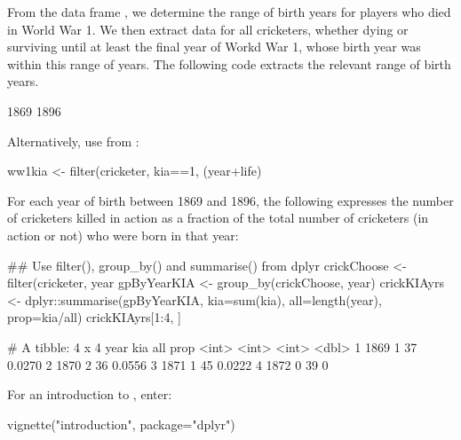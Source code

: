 From the data frame , we determine the range of birth
years for players who died in World War 1.  We then extract data for
all cricketers, whether dying or surviving until at least the final
year of Workd War 1, whose birth year was within this range of years.
The following code extracts the relevant range of birth years.
\begin{Schunk}
\begin{Soutput}
[1] 1869 1896
\end{Soutput}
\end{Schunk}

Alternatively, use  from :
\begin{Schunk}
\begin{Sinput}
ww1kia <- filter(cricketer,
                 kia==1, (year+life)%in% 1914:1918)
\end{Sinput}
\end{Schunk}

For each year of birth between 1869 and 1896, the following expresses
the number of cricketers killed in action as a fraction of the total
number of cricketers (in action or not) who were born in that year:
\begin{fullwidth}
\begin{Schunk}
\begin{Sinput}
## Use filter(), group_by() and summarise() from dplyr
crickChoose <- filter(cricketer,
                      year%in%(1869:1896), ((kia==1)|(year+life)>1918))
gpByYearKIA <- group_by(crickChoose, year)
crickKIAyrs <- dplyr::summarise(gpByYearKIA,
                                kia=sum(kia), all=length(year), prop=kia/all)
crickKIAyrs[1:4, ]
\end{Sinput}
\begin{Soutput}
# A tibble: 4 x 4
   year   kia   all   prop
  <int> <int> <int>  <dbl>
1  1869     1    37 0.0270
2  1870     2    36 0.0556
3  1871     1    45 0.0222
4  1872     0    39 0     
\end{Soutput}
\end{Schunk}
\end{fullwidth}

For an introduction to , enter:
\begin{Schunk}
\begin{Sinput}
vignette("introduction", package="dplyr")
\end{Sinput}
\end{Schunk}

